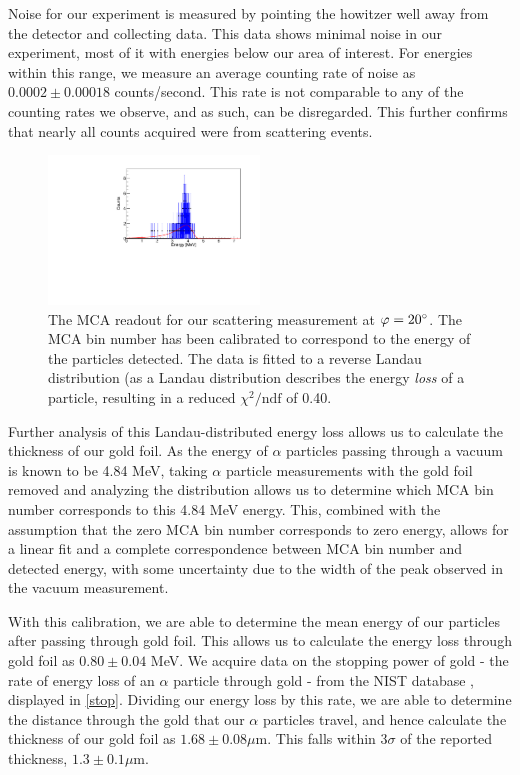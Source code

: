    Noise for our experiment is measured by pointing the howitzer well away from the detector and collecting data. This data shows minimal noise in our experiment, most of it with energies below our area of interest. For energies within this range, we measure an average counting rate of noise as $0.0002 \pm 0.00018$ counts/second. This rate is not comparable to any of the counting rates we observe, and as such, can be disregarded. This further confirms that nearly all counts acquired were from scattering events.
   \begin{figure}[h]
     \includegraphics[width=0.5\textwidth]{mca-readout-cal.pdf}
     \caption{The MCA readout for our scattering measurement at $\varphi = 20\degree$. The MCA bin number has been calibrated to correspond to the energy of the particles detected. The data is fitted to a reverse Landau distribution (as a Landau distribution describes the energy \textit{loss} of a particle, resulting in a reduced $\chi^2/\text{ndf}$ of 0.40.}
     \label{mca}
   \end{figure}

   Further analysis of this Landau-distributed energy loss allows us to calculate the thickness of our gold foil. As the energy of $\alpha$ particles passing through a vacuum is known to be 4.84 MeV, taking $\alpha$ particle measurements with the gold foil removed and analyzing the distribution allows us to determine which MCA bin number corresponds to this 4.84 MeV  energy. This, combined with the assumption that the zero MCA bin number corresponds to zero energy, allows for a linear fit and a complete correspondence between MCA bin number and detected energy, with some uncertainty due to the width of the peak observed in the vacuum measurement. 

   With this calibration, we are able to determine the mean energy of our particles after passing through gold foil. This allows us to calculate the energy loss through gold foil as $0.80 \pm 0.04$ MeV. We acquire data on the stopping power of gold - the rate of energy loss of an $\alpha$ particle through gold - from the NIST database \cite{nist}, displayed in \ref{stop}. Dividing our energy loss by this rate, we are able to determine the distance through the gold that our $\alpha$ particles travel, and hence calculate the thickness of our gold foil as $1.68 \pm 0.08 \mu$m. This falls within $3\sigma$ of the reported thickness, $1.3 \pm 0.1 \mu$m.

